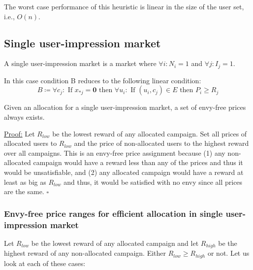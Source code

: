 \documentclass[12pt,letterpaper]{article}
\newcommand{\Campaign}{c}
\newcommand{\CampaignIndex}{j}
\newcommand{\User}{u}
\newcommand{\UserIndex}{i}
\newcommand{\CardinalityUsers}{n}
\newcommand{\Impressions}{I}
\newcommand{\Reward}{R}
\newcommand{\NumberOfUsers}{N}
\newcommand{\Edges}{E}
\newcommand{\Price}{P}
\newcommand{\AllocationMatrixEntry}{x}
\begin{document}
The worst case performance of this heuristic is linear in the size of the user set, i.e., $O(\CardinalityUsers)$.

\subsection*{Single user-impression market}

\begin{tcolorbox}[colback=green!5,colframe=green!40!black,title=Definition: single user-impression market]
A single user-impression market is a market where $\forall \UserIndex: \NumberOfUsers_\UserIndex = 1$ and $\forall \CampaignIndex: \Impressions_\CampaignIndex = 1$.
\end{tcolorbox}

In this case condition B reduces to the following linear condition:
$$B \coloneqq \forall \Campaign_{j}: \text{ If }  \AllocationMatrixEntry_{*\CampaignIndex} = \textbf{0} \text{ then }\forall \User_{i}: \text{ If } (\User_\UserIndex,\Campaign_\CampaignIndex)\in\Edges \text{ then } \Price_i \ge \Reward_j $$

\begin{tcolorbox}[colback=green!5,colframe=green!40!black,title=Theorem]
 Given an allocation for a single user-impression market, a set of envy-free prices always exists. 
 \end{tcolorbox}
\underline{Proof:} 
Let $\Reward_{low}$ be the lowest reward of any allocated campaign.
Set all prices of allocated users to $\Reward_{low}$ and the price of non-allocated users to the highest reward over all campaigns. 
This is an envy-free price assignment because (1) any non-allocated campaign would have a reward less than any of the prices and thus it would be unsatisfiable,
and (2) any allocated campaign would have a reward at least as big as $\Reward_{low}$ and thus, it would be satisfied with no envy since all prices are the same. $\square$

\subsubsection*{Envy-free price ranges for efficient allocation in single user-impression market}
Let $\Reward_{low}$ be the lowest reward of any allocated campaign and let $\Reward_{high}$ be the highest reward of any non-allocated campaign.
Either $\Reward_{low} \ge \Reward_{high}$ or not. Let us look at each of these cases:
\end{document}
